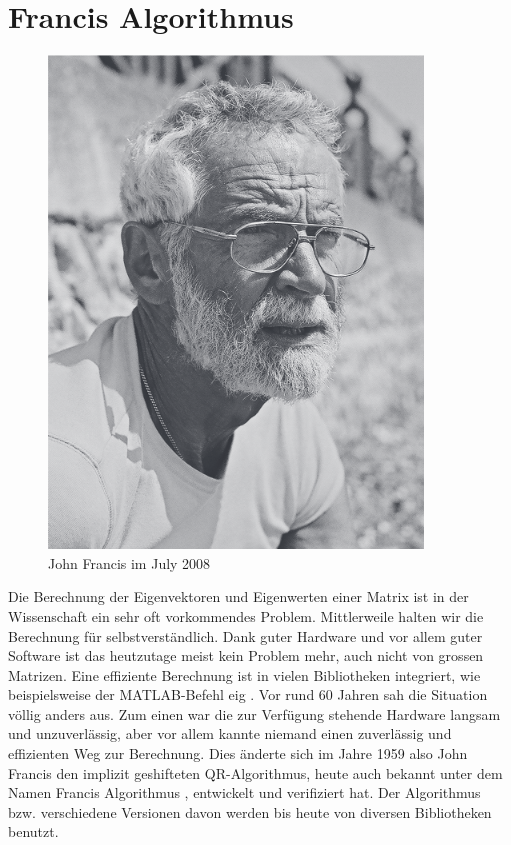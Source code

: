 %
%
%
\newcommand{\norm}[1]{\left\lVert#1\right\rVert}

\chapter{Francis Algorithmus\label{chapter:francis}}
\begin{refsection}

\begin{figure}
	\begin{center}
		\includegraphics[scale=0.5]{papers/francis/images/Francis.png}
		\caption{John Francis im July 2008 \cite{francis:francis_portrait}}
		\label{John Francis}
	\end{center}
\end{figure}

Die Berechnung der Eigenvektoren und Eigenwerten einer Matrix ist in der Wissenschaft ein sehr oft vorkommendes Problem.
Mittlerweile halten wir die Berechnung für selbstverständlich.
Dank guter Hardware und vor allem guter Software ist das heutzutage meist kein Problem mehr, auch nicht von grossen Matrizen.
Eine effiziente Berechnung ist in vielen Bibliotheken integriert, wie beispielsweise der MATLAB-Befehl \glqq eig \grqq.
Vor rund 60 Jahren sah die Situation völlig anders aus.
Zum einen war die zur Verfügung stehende Hardware langsam und unzuverlässig, aber vor allem kannte niemand einen zuverlässig und effizienten Weg zur Berechnung.
Dies änderte sich im Jahre 1959 also John Francis den implizit geshifteten QR-Algorithmus, heute auch bekannt unter dem Namen \glqq Francis Algorithmus \grqq, entwickelt und verifiziert hat.
Der Algorithmus bzw. verschiedene Versionen davon werden bis heute von diversen Bibliotheken benutzt. \cite{francis:watkins_paper}


\end{refsection}
